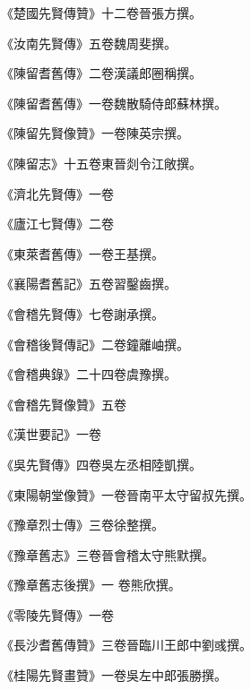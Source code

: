 \begin{pinyinscope}
 《楚國先賢傳贊》十二卷晉張方撰。



 《汝南先賢傳》五卷魏周斐撰。



 《陳留耆舊傳》二卷漢議郎圈稱撰。



 《陳留耆舊傳》一卷魏散騎侍郎蘇林撰。



 《陳留先賢像贊》一卷陳英宗撰。



 《陳留志》十五卷東晉剡令江敞撰。



 《濟北先賢傳》一卷



 《廬江七賢傳》二卷



 《東萊耆舊傳》一卷王基撰。



 《襄陽耆舊記》五卷習鑿齒撰。



 《會稽先賢傳》七卷謝承撰。



 《會稽後賢傳記》二卷鐘離岫撰。



 《會稽典錄》二十四卷虞豫撰。



 《會稽先賢像贊》五卷



 《漢世要記》一卷



 《吳先賢傳》四卷吳左丞相陸凱撰。



 《東陽朝堂像贊》一卷晉南平太守留叔先撰。



 《豫章烈士傳》三卷徐整撰。



 《豫章舊志》三卷晉會稽太守熊默撰。



 《豫章舊志後撰》一
 卷熊欣撰。



 《零陵先賢傳》一卷



 《長沙耆舊傳贊》三卷晉臨川王郎中劉彧撰。



 《桂陽先賢畫贊》一卷吳左中郎張勝撰。




\end{pinyinscope}
